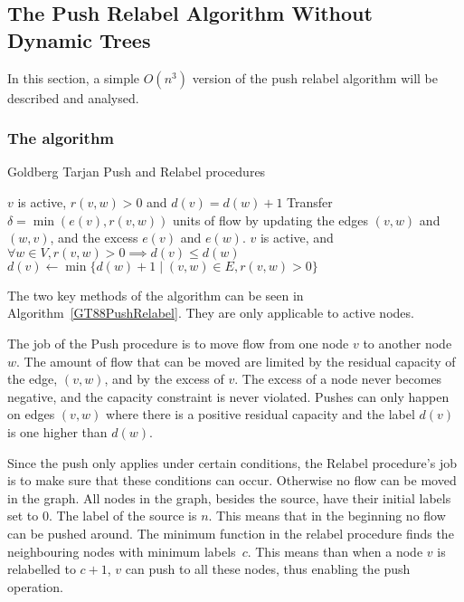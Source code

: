 \subsection{The Push Relabel Algorithm Without Dynamic Trees} \label{GT88-N3}
In this section, a simple $O(n^3)$ version of the push relabel algorithm will be described and analysed.

\subsubsection{The algorithm}
\begin{algorithm}
\caption{Goldberg Tarjan Push and Relabel procedures}\label{GT88PushRelabel}
\begin{algorithmic}[1]
\Statex
\Require $v$ is active, $r(v, w) > 0$ and $d(v) = d(w) + 1$
	\State Transfer $\delta = \min{(e(v), r(v,w))}$ units of flow by updating the edges $(v,w)$ and $(w,v)$, and the excess $e(v)$ and $e(w)$.
\EndProcedure
\Statex
\Require $v$ is active, and $\forall w \in V, r(v,w) > 0 \implies d(v) \le d(w)$
	\State $d(v)\gets \min{\{d(w) + 1 \mid (v,w) \in E, r(v,w) > 0 \}}$
\EndProcedure
\end{algorithmic}
\end{algorithm}

The two key methods of the algorithm can be seen in Algorithm~\ref{GT88PushRelabel}. They are only applicable to active nodes.

The job of the {\sc Push} procedure is to move flow from one node $v$ to another node $w$. The amount of flow that can be moved are limited by the residual 
capacity of the edge, $(v,w)$, and by the excess of $v$. The excess of a node never becomes negative, and the capacity constraint is
never violated. Pushes can only happen on edges $(v,w)$ where there is a positive residual capacity and the label $d(v)$ is one higher than $d(w)$.

Since the push only applies under certain conditions, the {\sc Relabel} procedure's job is to make sure that these conditions can occur. Otherwise no flow can be moved in the graph.
All nodes in the graph, besides the source, have their initial labels set to 0. The label of the source is $n$. This means that in the beginning no flow can be pushed
around. The minimum function in the relabel procedure finds the neighbouring nodes with minimum labels~$c$. This means than when a node $v$ is relabelled to $c+1$, $v$ can push
to all these nodes, thus enabling the push operation.

